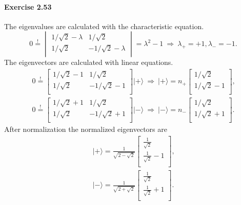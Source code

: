 \documentclass[a4paper,12pt]{article}
\newcommand{\exercise}[1]{\paragraph{Exercise #1}}
\newcommand{\ra}{\rangle}
\begin{document}
    \exercise{2.53} The eigenvalues are calculated with the characteristic equation.
    \begin{equation}
        0 \overset{!}{=} \begin{vmatrix}
            1 / \sqrt{2} - \lambda & 1 / \sqrt{2}\\
            1 / \sqrt{2} & -1 / \sqrt{2} - \lambda\\
        \end{vmatrix}
        = \lambda^2 - 1\ \Rightarrow\ \lambda_{+} = +1, \lambda_{-} = -1 \textrm{.}
    \end{equation}
    The eigenvectors are calculated with linear equations.
    \begin{gather}
        \nonumber
        0 \overset{!}{=} \begin{bmatrix}
            1 / \sqrt{2} - 1 & 1 / \sqrt{2}\\
            1 / \sqrt{2} & -1 / \sqrt{2} - 1\\
        \end{bmatrix}
        | + \ra \ \Rightarrow \ 
        | + \ra = n_+
        \begin{bmatrix}
            1/\sqrt{2}\\
            1/\sqrt{2} - 1\\
        \end{bmatrix}
        \textrm{,} \\
        0 \overset{!}{=} \begin{bmatrix}
            1 / \sqrt{2} + 1 & 1 / \sqrt{2}\\
            1 / \sqrt{2} & -1 / \sqrt{2} + 1\\
        \end{bmatrix}
        | - \ra \ \Rightarrow \ 
        | - \ra = n_-
        \begin{bmatrix}
            1/\sqrt{2}\\
            1/\sqrt{2} + 1\\
        \end{bmatrix}
        \textrm{.}
    \end{gather}
    After normalization the normalized eigenvectors are
    \begin{gather}
        | + \ra =
        \frac{1}{\sqrt{2 - \sqrt{2}}}
        \begin{bmatrix}
            \frac{1}{\sqrt{2}}\\
            \frac{1}{\sqrt{2}} - 1\\
        \end{bmatrix}
        \textrm{,} \\
        | - \ra =
        \frac{1}{\sqrt{2 + \sqrt{2}}}
        \begin{bmatrix}
            \frac{1}{\sqrt{2}}\\
            \frac{1}{\sqrt{2}} + 1\\
        \end{bmatrix}
        \textrm{.}
    \end{gather}
\end{document}
